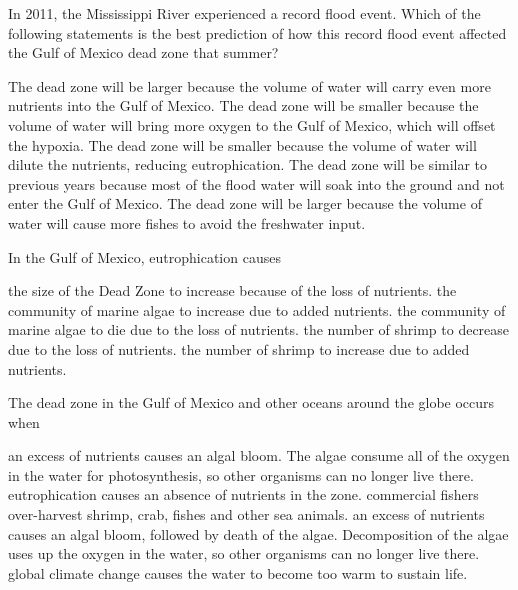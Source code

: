 \question
In 2011, the Mississippi River experienced a record flood event.  Which of the following statements is the best prediction of how this record flood event affected the Gulf of Mexico dead zone that summer?

\begin{choices}
\correctchoice The dead zone will be larger because the volume of water will carry even more nutrients into the Gulf of Mexico.%
\choice The dead zone will be smaller because the volume of water will bring more oxygen to the Gulf of Mexico, which will offset the hypoxia.%
\choice The dead zone will be smaller because the volume of water will dilute the nutrients, reducing eutrophication.%
\choice The dead zone will be similar to previous years because most of the flood water will soak into the ground and not enter the Gulf of Mexico.%
\choice The dead zone will be larger because the volume of water will cause more fishes to avoid the freshwater input.%
\end{choices}

\question
In the Gulf of Mexico, eutrophication causes

\begin{choices}
\choice the size of the Dead Zone to increase because of the loss of nutrients.%
\correctchoice the community of marine algae to increase due to added nutrients.%
\choice the community of marine algae to die due to the loss of nutrients.%
\choice the number of shrimp to decrease due to the loss of nutrients.%
\choice the number of shrimp to increase due to added nutrients.%
\end{choices}

\question
The dead zone in the Gulf of Mexico and other oceans around the globe occurs when

\begin{choices}
\choice an excess of nutrients causes an algal bloom. The algae consume all of the oxygen in the water for photosynthesis, so other organisms can no longer live there.%
\choice eutrophication causes an absence of nutrients in the zone.%
\choice commercial fishers over-harvest shrimp, crab, fishes and other sea animals.%
\correctchoice an excess of nutrients causes an algal bloom, followed by death of the algae. Decomposition of the algae uses up the oxygen in the water, so other organisms can no longer live there.%
\choice global climate change causes the water to become too warm to sustain life.%
\end{choices}



